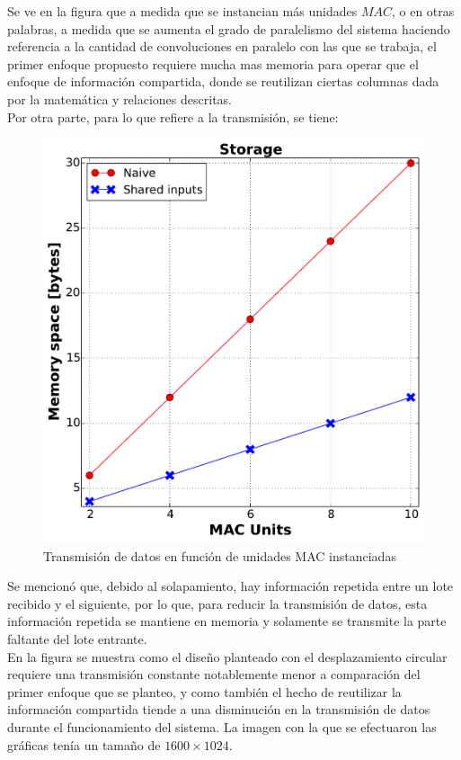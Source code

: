 \bigskip
Se ve en la figura que a medida que se instancian más unidades $MAC$, o en otras palabras, a medida que se aumenta el grado de paralelismo del sistema haciendo referencia a la cantidad de convoluciones en paralelo con las que se trabaja, el primer enfoque propuesto requiere mucha mas memoria para operar que el enfoque de información compartida, donde se reutilizan ciertas columnas dada por la matemática y relaciones descritas.\\

\bigskip
\bigskip
Por otra parte, para lo que refiere a la transmisión, se tiene:

\begin{figure}
\centering
\includegraphics[scale=0.5]{mem_space2}
\caption{Transmisión de datos en función de unidades MAC instanciadas }
\label{datatransmision}
\end{figure}

Se mencionó que, debido al solapamiento, hay información repetida entre un lote recibido y el siguiente, por lo que, para reducir la transmisión de datos, esta información repetida se mantiene en memoria y solamente se transmite la parte faltante del lote entrante.\\

En la figura se muestra como el diseño planteado con el desplazamiento circular requiere una transmisión constante notablemente menor a comparación del primer enfoque que se planteo, y como también el hecho de reutilizar la información compartida tiende a una disminución en la transmisión de datos durante el funcionamiento del sistema. La imagen con la que se efectuaron las gráficas tenía un tamaño de $1600 \times 1024$.


